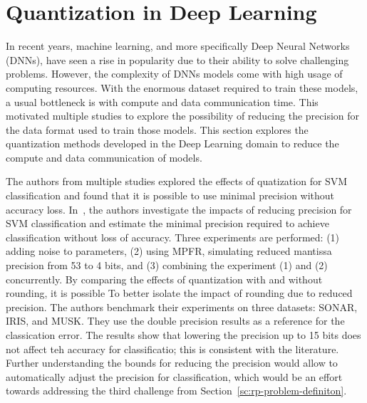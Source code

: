 \section{Quantization in Deep Learning}
In recent years, machine learning, and more specifically Deep Neural Networks (DNNs),
have seen a rise in popularity due to their ability to solve challenging problems.
However, the complexity of DNNs models come with high usage of computing resources.
With the enormous dataset required to train these models, a usual bottleneck is with compute and data communication time.
This motivated multiple studies \cite{Johnson2018-up,Wang2018-oo,Lesser2011-mn,Chen2018-an,Judd2015-kw,Vicuna2021-mw}
to explore the possibility of reducing the precision for the data format used to train those models.
This section explores the quantization methods developed in the Deep Learning 
domain to reduce the compute and data communication of models.

The authors from multiple studies explored the effects of quatization for SVM classification
and found that it is possible to use minimal precision without accuracy loss.
In~\cite{Lesser2011-mn}, the authors investigate the impacts of reducing precision for SVM
classification and estimate the minimal precision required to achieve classification 
without loss of accuracy. Three experiments are performed: 
(1) adding noise to parameters,
(2) using MPFR, simulating reduced mantissa precision from 53 to 4 bits,
and (3) combining the experiment (1) and (2) concurrently.
By comparing the effects of quantization with and without rounding, it is possible To
better isolate the impact of rounding due to reduced precision.
The authors benchmark their experiments on three datasets: SONAR, IRIS, and MUSK.
They use the double precision results as a reference for the classication error.
The results show that lowering the precision up to 15 bits does not affect teh accuracy
for classificatio; this is consistent with the literature.
Further understanding the bounds for reducing the precision would allow to automatically
adjust the precision for classification, which would be an effort towards addressing the third 
challenge from Section~\ref{sc:rp-problem-definiton}.


